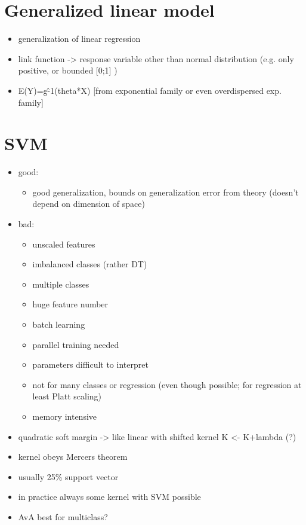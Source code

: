 \documentclass{article}
\begin{document}
\begin{multicols}{3}
\section{Generalized linear model}
\begin{itemize}
\item generalization of linear regression
\item link function -> response variable other than normal distribution (e.g. only positive, or bounded [0;1] )
\item E(Y)=g\^-1(theta*X)  [from exponential family or even overdispersed exp. family]
\end{itemize}

\section{SVM}
\begin{itemize}
\item good:
\begin{itemize}
  \item good generalization, bounds on generalization error from theory (doesn't depend on dimension of space)
\end{itemize}
\item bad:
\begin{itemize}
  \item unscaled features
  \item imbalanced classes (rather DT)
  \item multiple classes
  \item huge feature number
  \item batch learning
  \item parallel training needed
  \item parameters difficult to interpret
  \item not for many classes or regression (even though possible; for regression at least Platt scaling)
  \item memory intensive
\end{itemize}
\item quadratic soft margin -> like linear with shifted kernel K <- K+lambda (?)
\item kernel obeys Mercers theorem
\item usually 25\% support vector
\item in practice always some kernel with SVM possible
\item AvA best for multiclass?
\end{itemize}


\end{multicols}
\end{document}
